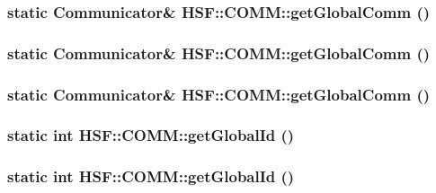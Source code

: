 \label{classHSF_1_1COMM_a73b9e5bcef8100fa37a940c2dd744c7b}
\hypertarget{classHSF_1_1COMM_adae610b00b4c4cd966a0d19cdf5fc0e8}{
\subsubsection[{getGlobalComm}]{\setlength{\rightskip}{0pt plus 5cm}static {\bf Communicator}\& HSF::COMM::getGlobalComm ()}}
\label{classHSF_1_1COMM_adae610b00b4c4cd966a0d19cdf5fc0e8}
\hypertarget{classHSF_1_1COMM_adae610b00b4c4cd966a0d19cdf5fc0e8}{
\subsubsection[{getGlobalComm}]{\setlength{\rightskip}{0pt plus 5cm}static {\bf Communicator}\& HSF::COMM::getGlobalComm ()}}
\label{classHSF_1_1COMM_adae610b00b4c4cd966a0d19cdf5fc0e8}
\hypertarget{classHSF_1_1COMM_adae610b00b4c4cd966a0d19cdf5fc0e8}{
\subsubsection[{getGlobalComm}]{\setlength{\rightskip}{0pt plus 5cm}static {\bf Communicator}\& HSF::COMM::getGlobalComm ()}}
\label{classHSF_1_1COMM_adae610b00b4c4cd966a0d19cdf5fc0e8}
\hypertarget{classHSF_1_1COMM_a4c2a5c578e26fb2e53f8fad13f9e79ba}{
\subsubsection[{getGlobalId}]{\setlength{\rightskip}{0pt plus 5cm}static int HSF::COMM::getGlobalId ()}}
\label{classHSF_1_1COMM_a4c2a5c578e26fb2e53f8fad13f9e79ba}
\hypertarget{classHSF_1_1COMM_a4c2a5c578e26fb2e53f8fad13f9e79ba}{
\subsubsection[{getGlobalId}]{\setlength{\rightskip}{0pt plus 5cm}static int HSF::COMM::getGlobalId ()}}
